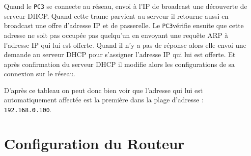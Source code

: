 \documentclass[11pt]{book}
\begin{document}
	\begin{figure}[ht!]
		\centering
	\end{figure}

	Quand le \texttt{PC3} se connecte au réseau, envoi à l'IP de broadcast une découverte de serveur DHCP. Quand cette trame parvient au serveur il retourne aussi en broadcast une offre d'adresse IP et de passerelle. Le \texttt{PC3}vérifie ensuite que cette adresse ne soit pas occupée pas quelqu'un en envoyant une requête ARP à l'adresse IP qui lui est offerte. Quand il n'y a pas de réponse alors elle envoi une demande au serveur DHCP pour s'assigner l'adresse IP qui lui est offerte. Et après confirmation du serveur DHCP il modifie alors les configurations de sa connexion sur le réseau. 

	D'après ce tableau on peut donc bien voir que l'adresse qui lui est automatiquement affectée est la première dans la plage d'adresse : \texttt{192.168.0.100}. 

	\newpage

	\section{Configuration du Routeur}
\end{document}
